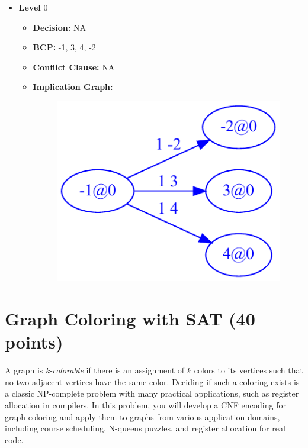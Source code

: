 \documentclass{article}
\newenvironment{solution}{\color{blue} \em }{}
\begin{document}
\begin{enumerate}
\begin{solution}
\begin{itemize}
\item \textbf{Level} 0
\begin{itemize}
	\item \textbf{Decision:} NA
	\item \textbf{BCP:} -1, 3, 4, -2
	\item \textbf{Conflict Clause:} NA
	\item \textbf{Implication Graph:} 
	\begin{figure}[h!]
		\begin{center}
			\includegraphics[scale=0.75]{sat-images/graph4}
		\end{center}
	\end{figure}
\end{itemize}
	\end{itemize}
\end{solution}

\end{enumerate}

\pagebreak

\section{Graph Coloring with SAT (40 points)}\label{coloring}

A graph is \emph{k-colorable} if there is an assignment of $k$ colors to its vertices such that no two adjacent vertices have the same color.  Deciding if such a coloring exists is a classic NP-complete problem with many practical applications, such as register allocation in compilers.  In this problem, you will develop a CNF encoding for graph coloring and apply them to graphs from various application domains, including course scheduling, N-queens puzzles, and register allocation for real code.
\end{document}
